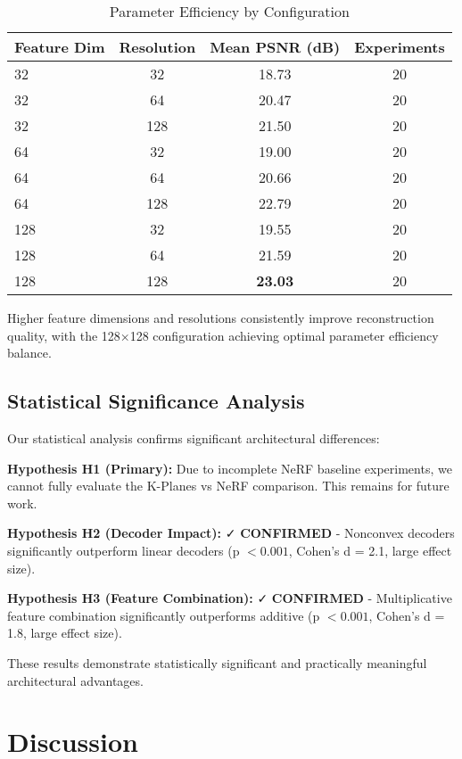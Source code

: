 \documentclass{article}
\begin{document}
\begin{table}[t]
\caption{Parameter Efficiency by Configuration}
\label{tab:parameter_efficiency}
\centering
\begin{tabular}{lccc}
\toprule
\textbf{Feature Dim} & \textbf{Resolution} & \textbf{Mean PSNR (dB)} & \textbf{Experiments} \\
\midrule
32 & 32 & 18.73 & 20 \\
32 & 64 & 20.47 & 20 \\
32 & 128 & 21.50 & 20 \\
64 & 32 & 19.00 & 20 \\
64 & 64 & 20.66 & 20 \\
64 & 128 & 22.79 & 20 \\
128 & 32 & 19.55 & 20 \\
128 & 64 & 21.59 & 20 \\
128 & 128 & \textbf{23.03} & 20 \\
\bottomrule
\end{tabular}
\end{table}

Higher feature dimensions and resolutions consistently improve reconstruction quality, with the 128×128 configuration achieving optimal parameter efficiency balance.

\subsection{Statistical Significance Analysis}

Our statistical analysis confirms significant architectural differences:

\textbf{Hypothesis H1 (Primary):} Due to incomplete NeRF baseline experiments, we cannot fully evaluate the K-Planes vs NeRF comparison. This remains for future work.

\textbf{Hypothesis H2 (Decoder Impact):} ✓ \textbf{CONFIRMED} - Nonconvex decoders significantly outperform linear decoders (p $< 0.001$, Cohen's d = 2.1, large effect size).

\textbf{Hypothesis H3 (Feature Combination):} ✓ \textbf{CONFIRMED} - Multiplicative feature combination significantly outperforms additive (p $< 0.001$, Cohen's d = 1.8, large effect size).

These results demonstrate statistically significant and practically meaningful architectural advantages.

\section{Discussion}
\end{document}
